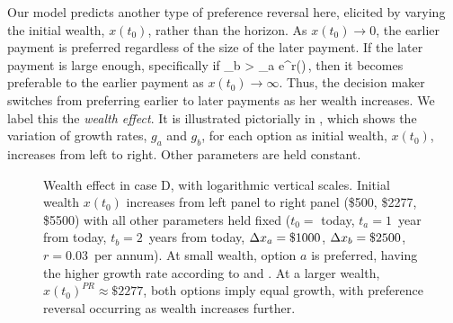 Our model predicts another type of preference reversal here, elicited by varying the initial wealth, $x\left(t_0\right)$, rather than the horizon. As $x\left(t_0\right)\to0$, the earlier payment is preferred regardless of the size of the later payment. If the later payment is large enough, specifically if
%
\be
\Dx_b > \Dx_a e^{r\del}\left(\frac{\hor+\del}{\hor}\right)\,,
\ee
%
then it becomes preferable to the earlier payment as $x\left(t_0\right)\to\infty$. Thus, the decision maker switches from preferring earlier to later payments as her wealth increases. We label this the \textit{wealth effect}. It is illustrated pictorially in , which shows the variation of growth rates, $g_a$ and $g_b$, for each option as initial wealth, $x\left(t_0\right)$, increases from left to right. Other parameters are held constant.

\begin{figure}[!htb]
\centering
{}
\caption{Wealth effect in case D, with logarithmic vertical scales. Initial wealth $x\left(t_0\right)$ increases from left panel to right panel (\$500, \$2277, \$5500) with all other parameters held fixed ($t_0=$ today, $t_a=1$~year from today, $t_b=2$~years from today, $\Delta x_a=\$1000$, $\Delta x_b=\$2500$, $r=0.03$~per annum). At small wealth, option $a$ is preferred, having the higher growth rate according to  and . At a larger wealth, $x\left(t_0\right)^{PR}\approx \$2277$, both options imply equal growth, with preference reversal occurring as wealth increases further. }
\end{figure}

